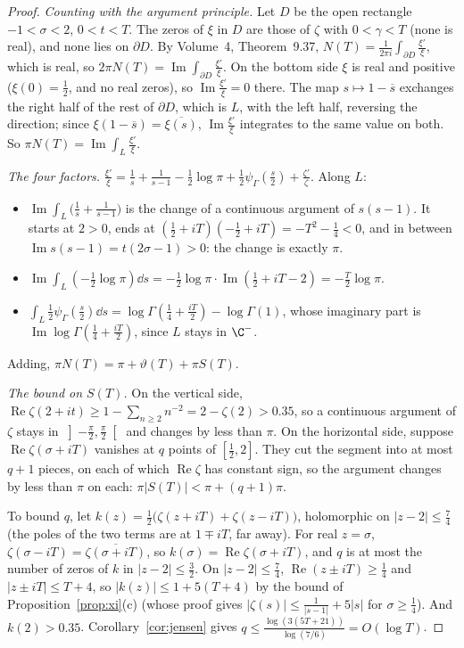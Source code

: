 \begin{proof}
\emph{Counting with the argument principle.} Let $D$ be the open rectangle $-1<\sigma<2$, $0<t<T$. The zeros of $\xi$ in $D$ are those of $\zeta$ with $0<\gamma<T$ (none is real), and none
lies on $\partial D$. By Volume~4, Theorem~9.37, $N(T)=\frac1{2\pi i}\int_{\partial D}\frac{\xi'}\xi$, which is real, so $2\pi N(T)=\operatorname{Im}\int_{\partial D}\frac{\xi'}\xi$. On the bottom side $\xi$ is real and
positive ($\xi(0)=\frac12$, and no real zeros), so $\operatorname{Im}\frac{\xi'}\xi=0$ there. The map $s\mapsto1-\overline s$ exchanges the right half of the rest of $\partial D$, which is $L$, with the left
half, reversing the direction; since $\xi(1-\overline s)=\overline{\xi(s)}$, $\operatorname{Im}\frac{\xi'}\xi$ integrates to the same value on both. So $\pi N(T)=\operatorname{Im}\int_L\frac{\xi'}\xi$.

\emph{The four factors.} $\frac{\xi'}\xi=\frac1s+\frac1{s-1}-\frac12\log\pi+\frac12\psi_\Gamma(\frac s2)+\frac{\zeta'}\zeta$. Along $L$:
\begin{itemize}
\item $\operatorname{Im}\int_L\bigl(\frac1s+\frac1{s-1}\bigr)$ is the change of a continuous argument of $s(s-1)$. It starts at $2>0$, ends at $(\frac12+iT)(-\frac12+iT)=-T^2-\frac14<0$, and in between
$\operatorname{Im}s(s-1)=t(2\sigma-1)>0$: the change is exactly $\pi$.
\item $\operatorname{Im}\int_L(-\frac12\log\pi)\dd s=-\frac12\log\pi\cdot\operatorname{Im}(\frac12+iT-2)=-\frac T2\log\pi$.
\item $\int_L\frac12\psi_\Gamma(\frac s2)\dd s=\log\Gamma(\frac14+\frac{iT}2)-\log\Gamma(1)$, whose imaginary part is $\operatorname{Im}\log\Gamma(\frac14+\frac{iT}2)$, since $L$ stays in $\C^-$.
\end{itemize}
Adding, $\pi N(T)=\pi+\vartheta(T)+\pi S(T)$.

\emph{The bound on $S(T)$.} On the vertical side, $\operatorname{Re}\zeta(2+it)\ge1-\sum_{n\ge2}n^{-2}=2-\zeta(2)>0.35$, so a continuous argument of $\zeta$ stays in $\left]-\frac\pi2,\frac\pi2\right[$ and changes by
less than $\pi$. On the horizontal side, suppose $\operatorname{Re}\zeta(\sigma+iT)$ vanishes at $q$ points of $[\frac12,2]$. They cut the segment into at most $q+1$ pieces, on each of which
$\operatorname{Re}\zeta$ has constant sign, so the argument changes by less than $\pi$ on each: $\pi|S(T)|<\pi+(q+1)\pi$.

To bound $q$, let $k(z)=\frac12\bigl(\zeta(z+iT)+\zeta(z-iT)\bigr)$, holomorphic on $|z-2|\le\frac74$ (the poles of the two terms are at $1\mp iT$, far away). For real $z=\sigma$,
$\zeta(\sigma-iT)=\overline{\zeta(\sigma+iT)}$, so $k(\sigma)=\operatorname{Re}\zeta(\sigma+iT)$, and $q$ is at most the number of zeros of $k$ in $|z-2|\le\frac32$. On $|z-2|\le\frac74$, $\operatorname{Re}(z\pm iT)\ge\frac14$ and
$|z\pm iT|\le T+4$, so $|k(z)|\le1+5(T+4)$ by the bound of Proposition~\ref{prop:xi}(c) (whose proof gives $|\zeta(s)|\le\frac1{|s-1|}+5|s|$ for $\sigma\ge\frac14$). And $k(2)>0.35$. Corollary~\ref{cor:jensen}
gives $q\le\frac{\log(3(5T+21))}{\log(7/6)}=O(\log T)$.


\end{proof}
